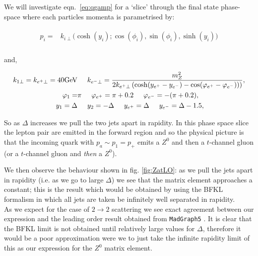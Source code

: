 		We will investigate eqn.~\eqref{eq:qgamp} for a `slice' through the final state phase-space
		where each particles momenta is parametrised by:

		\begin{align*}
		\begin{split}
			p_i = &k_{i\perp}\Big(\cosh (y_i); \cos (\phi_i), \sin (\phi_i), \sinh (y_i)\Big) \\
		\end{split}
		\end{align*}

		and,

		\begin{align}
		\begin{split}
			k_{1\perp} = k_{e^+\perp} = 40\mbox{GeV}& \hspace{0.5cm} k_{e^-\perp} =
			\frac{m_Z^2}{2k_{e^+\perp}\left(\cosh(y_{e^+} - y_{e^-}) -
			    \cos(\varphi_{e^+} - \varphi_{e^-}))\right)}, \\
			\varphi_{1} =& \pi \hspace{0.5cm} \varphi_{e^+} = \pi + 0.2 \hspace{0.5cm}
			\varphi_{e^-} = -(\pi + 0.2), \\
			y_1=\Delta& \hspace{0.5cm} y_2=-\Delta \hspace{0.5cm} y_{e^+} = \Delta
			\hspace{0.5cm} y_{e^-} = \Delta - 1.5,
			\label{eq:momenta}
		\end{split}
		\end{align}

		So as $\Delta$ increases we pull the two jets apart in rapidity.  In this phase space slice
		the lepton pair are emitted in the forward region and so the physical picture is that the
		incoming quark with $p_a\sim p_1=p_+$ emits a $Z^0$ and then a $t$-channel gluon (or a
		$t$-channel gluon and \emph{then} a $Z^0$).

		We then observe the behaviour shown in fig. \eqref{fig:ZatLO}: as we pull the
		jets apart in rapidity (i.e. as we go to large $\Delta$) we see that the matrix element
		approaches a constant; this is the result which would be obtained by using the BFKL
		formalism in which all jets are taken be infinitely well separated in rapidity.\\As we
		expect for the case of $2\to 2$ scattering we see exact agreement between our expression
		and the leading order result obtained from \texttt{MadGraph5} \cite{Alwall:2014hca}.
		It is clear that the BFKL limit is not obtained until relatively large values for $\Delta$,
		therefore it would be a poor approximation were we to just take the infinite rapidity limit
		of this as our expression for the $Z^0$ matrix element.

